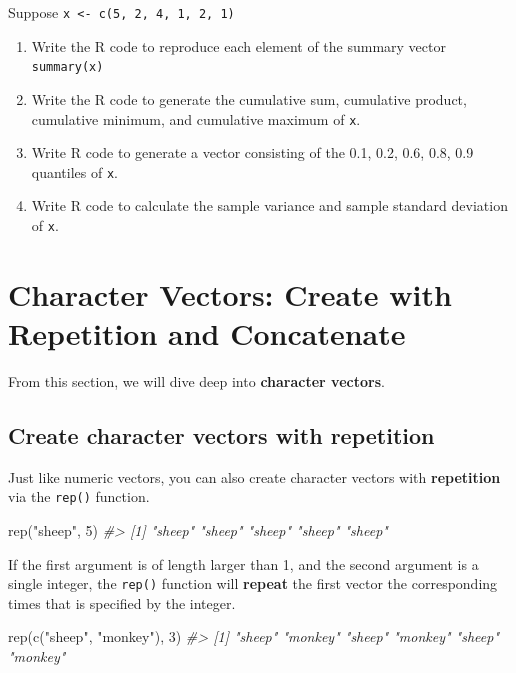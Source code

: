\documentclass[
]{book}
\newenvironment{Shaded}{\begin{snugshade}}{\end{snugshade}}
\newcommand{\CommentTok}[1]{\textcolor[rgb]{0.56,0.35,0.01}{\textit{#1}}}
\newcommand{\DecValTok}[1]{\textcolor[rgb]{0.00,0.00,0.81}{#1}}
\newcommand{\FunctionTok}[1]{\textcolor[rgb]{0.00,0.00,0.00}{#1}}
\newcommand{\NormalTok}[1]{#1}
\newcommand{\StringTok}[1]{\textcolor[rgb]{0.31,0.60,0.02}{#1}}
\begin{document}
Suppose \texttt{x\ \textless{}-\ c(5,\ 2,\ 4,\ 1,\ 2,\ 1)}

\begin{enumerate}
\def\labelenumi{\arabic{enumi}.}
\item
  Write the R code to reproduce each element of the summary vector \texttt{summary(x)}
\item
  Write the R code to generate the cumulative sum, cumulative product, cumulative minimum, and cumulative maximum of \texttt{x}.
\item
  Write R code to generate a vector consisting of the 0.1, 0.2, 0.6, 0.8, 0.9 quantiles of \texttt{x}.
\item
  Write R code to calculate the sample variance and sample standard deviation of \texttt{x}.
\end{enumerate}

\hypertarget{char-concatenate}{%
\section{Character Vectors: Create with Repetition and Concatenate}\label{char-concatenate}}

From this section, we will dive deep into \textbf{character vectors}.

\hypertarget{create-character-vectors-with-repetition}{%
\subsection{Create character vectors with repetition}\label{create-character-vectors-with-repetition}}

Just like numeric vectors, you can also create character vectors with \textbf{repetition} via the \texttt{rep()} function.

\begin{Shaded}
\begin{Highlighting}[]
\FunctionTok{rep}\NormalTok{(}\StringTok{"sheep"}\NormalTok{, }\DecValTok{5}\NormalTok{)}
\CommentTok{\#\textgreater{} [1] "sheep" "sheep" "sheep" "sheep" "sheep"}
\end{Highlighting}
\end{Shaded}

If the first argument is of length larger than 1, and the second argument is a single integer, the \texttt{rep()} function will \textbf{repeat} the first vector the corresponding times that is specified by the integer.

\begin{Shaded}
\begin{Highlighting}[]
\FunctionTok{rep}\NormalTok{(}\FunctionTok{c}\NormalTok{(}\StringTok{"sheep"}\NormalTok{, }\StringTok{"monkey"}\NormalTok{), }\DecValTok{3}\NormalTok{)}
\CommentTok{\#\textgreater{} [1] "sheep"  "monkey" "sheep"  "monkey" "sheep"  "monkey"}
\end{Highlighting}
\end{Shaded}
\end{document}
